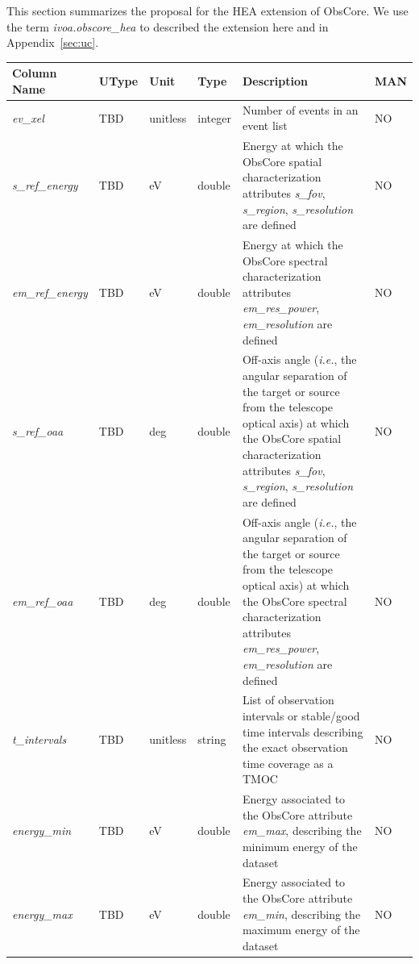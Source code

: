 \documentclass[11pt,a4paper]{ivoa}
\begin{document}
This section summarizes the proposal for the \gls{HEA} extension of ObsCore.  We use the term {\em ivoa.obscore\_hea\/} to described the extension here and in Appendix~\ref{sec:uc}.

\begin{landscape}
\begin{center}
\begin{longtable}{ | p{0.125\linewidth} | p{0.075\linewidth} | p{0.075\linewidth} | p{0.075\linewidth} | p{0.6\linewidth} | p{0.05\linewidth} |}
\hline
{\centering \bf Column Name}     &{\centering \bf UType} &{\centering \bf Unit} &{\centering \bf Type} &{\centering \bf Description} &{\centering \bf MAN}\\
\hline
{\em ev\_xel\/} & TBD &  unitless & integer & Number of events in an event list & NO \\
\hline
{\em s\_ref\_energy\/} & TBD & eV & double & Energy at which the ObsCore spatial characterization attributes {\em s\_fov\/}, {\em s\_region\/}, {\em s\_resolution\/} are defined & NO \\
\hline
{\em em\_ref\_energy\/}  & TBD & eV & double & Energy at which the ObsCore spectral characterization attributes {\em em\_res\_power\/}, {\em em\_resolution} are defined & NO \\
\hline
{\em s\_ref\_oaa\/} & TBD & deg & double & Off-axis angle ({\em i.e.\/}, the angular separation of the target or source from the telescope optical axis) at which the ObsCore spatial characterization attributes {\em s\_fov\/}, {\em s\_region\/}, {\em s\_resolution\/} are defined & NO \\
\hline
{\em em\_ref\_oaa\/} & TBD & deg & double & Off-axis angle ({\em i.e.\/}, the angular separation of the target or source from the telescope optical axis) at which the ObsCore spectral characterization attributes {\em em\_res\_power\/}, {\em em\_resolution\/} are defined & NO \\
\hline
{\em t\_intervals\/} & TBD & unitless & string & List of observation intervals or stable/good time intervals describing the exact observation time coverage as a TMOC  & NO \\
\hline
{\em energy\_min\/} & TBD & eV & double & Energy associated to the ObsCore attribute {\em em\_max\/}, describing the minimum energy of the dataset & NO \\
\hline
{\em energy\_max\/} & TBD & eV & double & Energy associated to the ObsCore attribute {\em em\_min\/}, describing the maximum energy of the dataset & NO \\

\end{longtable}
\end{center}
\end{landscape}
\end{document}
